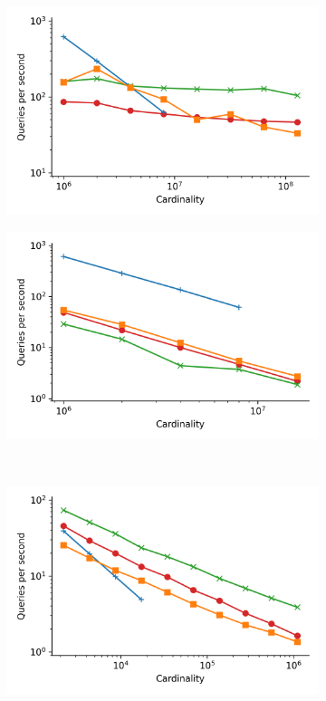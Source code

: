\documentclass[review,supplement,onefignum,onetabnum]{siamonline220329}
\begin{document}
\begin{figure}
\begin{subfigure}[b]{0.47\textwidth}
        \includegraphics[width=1.0\textwidth]{plots/sift_PermutedBall_100_throughput.png}
        \label{fig:supplement:sift-scaling}
    \end{subfigure}%
    \begin{subfigure}[b]{0.47\textwidth}
        \includegraphics[width=1.0\textwidth]{plots/random_PermutedBall_100_throughput.png}
        \label{fig:supplement:random-scaling}
    \end{subfigure}%
    \\
    \begin{subfigure}[b]{0.47\textwidth}
        \includegraphics[width=1.0\textwidth]{plots/silva-SSU-Ref_PermutedBall_100_throughput.png}

\end{subfigure}
\end{figure}
\end{document}
